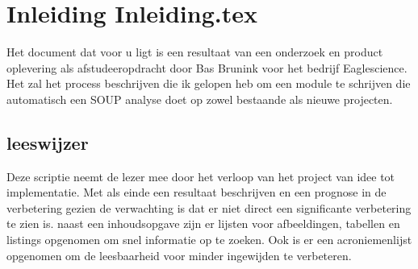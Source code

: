 \chapter{Inleiding Inleiding.tex} %

\label{ch:Inleiding} %
Het document dat voor u ligt is een resultaat van een onderzoek en product oplevering als afstudeeropdracht door Bas Brunink voor het bedrijf Eaglescience. Het zal het process beschrijven die ik gelopen heb om een module te schrijven die automatisch een SOUP analyse doet op zowel bestaande als nieuwe projecten. 

\section{leeswijzer}
Deze scriptie neemt de lezer mee door het verloop van het project van idee tot implementatie. Met als einde een resultaat beschrijven en een prognose in de verbetering gezien de verwachting is dat er niet direct een significante verbetering te zien is. 
naast een inhoudsopgave zijn er lijsten voor afbeeldingen, tabellen en listings opgenomen om snel informatie op te zoeken. Ook is er een acroniemenlijst opgenomen om de leesbaarheid voor minder ingewijden te verbeteren. 
